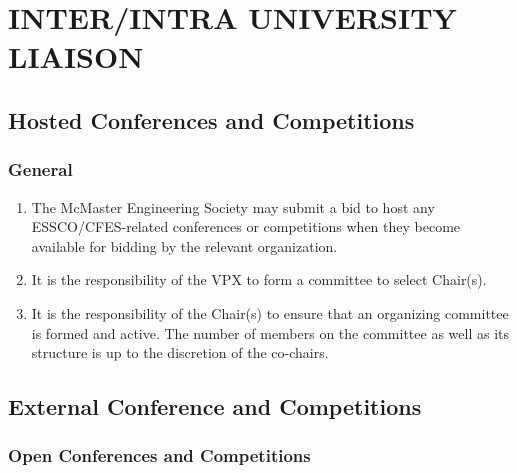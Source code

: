 \section{INTER/INTRA UNIVERSITY LIAISON}

\hypertarget{hosted-conferences-and-competitions}{%
 \subsection{Hosted Conferences and
  Competitions}
 \label{hosted-conferences-and-competitions}}

\hypertarget{conferences-general}{%
 \subsubsection{General}
 \label{conferences-general}}

\begin{enumerate}
 \item
  The McMaster Engineering Society may submit a bid to host any
  ESSCO/CFES-related conferences or competitions when they become
  available for bidding by the relevant organization.
 \item
  It is the responsibility of the VPX to form a committee to select
  Chair(s).
 \item
  It is the responsibility of the Chair(s) to ensure that an organizing
  committee is formed and active. The number of members on the committee
  as well as its structure is up to the discretion of the co-chairs.

\end{enumerate}

\hypertarget{external-conference-and-competitions}{%
 \subsection{External Conference and
  Competitions}
 \label{external-conference-and-competitions}}

\hypertarget{open-conferences-and-competitions}{%
 \subsubsection{Open Conferences and
  Competitions}
 \label{open-conferences-and-competitions}}

